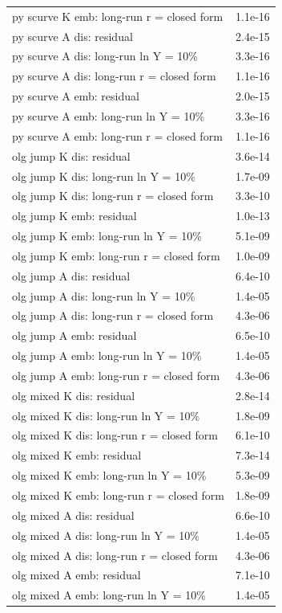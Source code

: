 \begin{tabular}{lc}
py scurve K emb: long-run r = closed form & 1.1e-16\\
py scurve A dis: residual & 2.4e-15\\
py scurve A dis: long-run ln Y = 10\% & 3.3e-16\\
py scurve A dis: long-run r = closed form & 1.1e-16\\
py scurve A emb: residual & 2.0e-15\\
py scurve A emb: long-run ln Y = 10\% & 3.3e-16\\
py scurve A emb: long-run r = closed form & 1.1e-16\\
olg jump K dis: residual & 3.6e-14\\
olg jump K dis: long-run ln Y = 10\% & 1.7e-09\\
olg jump K dis: long-run r = closed form & 3.3e-10\\
olg jump K emb: residual & 1.0e-13\\
olg jump K emb: long-run ln Y = 10\% & 5.1e-09\\
olg jump K emb: long-run r = closed form & 1.0e-09\\
olg jump A dis: residual & 6.4e-10\\
olg jump A dis: long-run ln Y = 10\% & 1.4e-05\\
olg jump A dis: long-run r = closed form & 4.3e-06\\
olg jump A emb: residual & 6.5e-10\\
olg jump A emb: long-run ln Y = 10\% & 1.4e-05\\
olg jump A emb: long-run r = closed form & 4.3e-06\\
olg mixed K dis: residual & 2.8e-14\\
olg mixed K dis: long-run ln Y = 10\% & 1.8e-09\\
olg mixed K dis: long-run r = closed form & 6.1e-10\\
olg mixed K emb: residual & 7.3e-14\\
olg mixed K emb: long-run ln Y = 10\% & 5.3e-09\\
olg mixed K emb: long-run r = closed form & 1.8e-09\\
olg mixed A dis: residual & 6.6e-10\\
olg mixed A dis: long-run ln Y = 10\% & 1.4e-05\\
olg mixed A dis: long-run r = closed form & 4.3e-06\\
olg mixed A emb: residual & 7.1e-10\\
olg mixed A emb: long-run ln Y = 10\% & 1.4e-05\\

\end{tabular}
